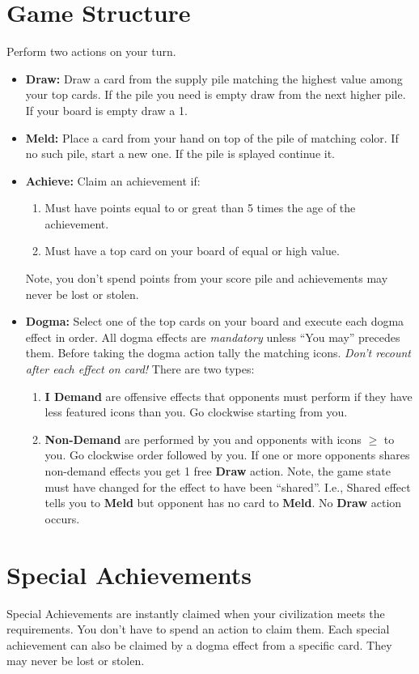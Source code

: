 \documentclass[12pt]{article}
\newenvironment{enumerateCustom}
{\begin{enumerate}
  \setlength{\itemsep}{1pt}
  \setlength{\parskip}{0pt}
  \setlength{\parsep}{0pt}}
{\end{enumerate}}
\newenvironment{itemizeCustom}
{\begin{itemize}
  \setlength{\itemsep}{1pt}
  \setlength{\parskip}{0pt}
  \setlength{\parsep}{0pt}}
{\end{itemize}}
\begin{document}
\begin{mdframed}[style = customFrame]
\begin{multicols*}{2}
\section*{Game Structure}
Perform two actions on your turn.
\begin{itemizeCustom}
	\item \textbf{Draw:} Draw a card from the supply pile matching the highest value among your top cards. If the pile you need is empty draw from the next higher pile. If your board is empty draw a 1.
	\item \textbf{Meld:} Place a card from your hand on top of the pile of matching color. If no such pile, start a new one. If the pile is splayed continue it. 
	\item \textbf{Achieve:} Claim an achievement if:
		\begin{enumerateCustom}
			\item Must have points equal to or great than 5 times the age of the achievement.
			\item Must have a top card on your board of equal or high value.
		\end{enumerateCustom}
		Note, you don't spend points from your score pile and achievements may never be lost or stolen.
	\item \textbf{Dogma:} Select one of the top cards on your board and execute each dogma effect in order. All dogma effects are \emph{mandatory} unless ``You may'' precedes them. Before taking the dogma action tally the matching icons. \emph{Don't recount after each effect on card!} There are two types:
		\begin{enumerateCustom}
			\item \textbf{I Demand} are offensive effects that opponents must perform if they have less featured icons than you. Go clockwise starting from you.
			\item \textbf{Non-Demand} are performed by you and opponents with icons $\ge$ to you. Go clockwise order followed by you. If one or more opponents shares non-demand effects you get 1 free \textbf{Draw} action. Note, the game state must have changed for the effect to have been ``shared''. I.e., Shared effect tells you to \textbf{Meld} but opponent has no card to \textbf{Meld}. No \textbf{Draw} action occurs.
		\end{enumerateCustom}
\end{itemizeCustom}

\section*{Special Achievements}
Special Achievements are instantly claimed when your civilization meets the requirements. You don't have to spend an action to claim them. Each special achievement can also be claimed by a dogma effect from a specific card. They may never be lost or stolen.


\end{multicols*}
\end{mdframed}
\end{document}
